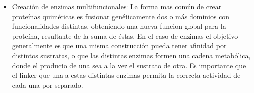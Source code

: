 \begin{itemize}
 \item Creación de enzimas multifuncionales\cite{ljungcrantz1989construction,fan2009engineering}:
La forma mas común de crear proteínas quiméricas es fusionar genéticamente dos o más dominios con funcionalidades distintas, obteniendo una nueva funcion global para la proteína, resultante de la suma de éstas.
En el caso de enzimas el objetivo generalmente es que una misma construcción pueda tener afinidad por distintos sustratos, o que las distintas enzimas formen una cadena metabólica, donde el producto de una sea a la vez el sustrato de otra.
Es importante que el linker que una a estas distintas enzimas permita la correcta actividad de cada una por separado.


\end{itemize}
